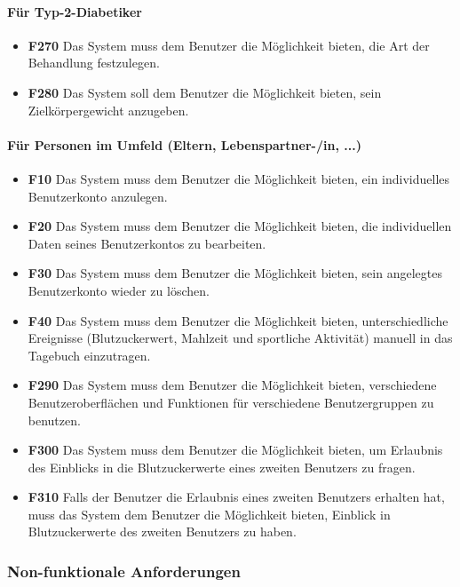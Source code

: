 	\paragraph{Für Typ-2-Diabetiker}\mbox{}
	\begin{itemize}
		\item\textbf{\lbrack F270\rbrack} Das System muss dem Benutzer die Möglichkeit bieten, die Art der Behandlung festzulegen.
		\item\textbf{\lbrack F280\rbrack} Das System soll dem Benutzer die Möglichkeit bieten, sein Zielkörpergewicht anzugeben.
	\end{itemize}
	\paragraph{Für Personen im Umfeld (Eltern, Lebenspartner-/in, ...)}\mbox{}
	\begin{itemize}
		\item\textbf{\lbrack F10\rbrack} Das System muss dem Benutzer die Möglichkeit bieten, ein individuelles Benutzerkonto anzulegen.
		\item\textbf{\lbrack F20\rbrack}  Das System muss dem Benutzer die Möglichkeit bieten, die individuellen Daten seines Benutzerkontos zu bearbeiten.
		\item\textbf{\lbrack F30\rbrack} Das System muss dem Benutzer die Möglichkeit bieten, sein angelegtes Benutzerkonto wieder zu löschen.
		\item\textbf{\lbrack F40\rbrack} Das System muss dem Benutzer die Möglichkeit bieten, unterschiedliche Ereignisse (Blutzuckerwert, Mahlzeit und sportliche Aktivität) manuell in das Tagebuch einzutragen.
		\item\textbf{\lbrack F290\rbrack} Das System muss dem Benutzer die Möglichkeit bieten, verschiedene Benutzeroberflächen und Funktionen für verschiedene Benutzergruppen zu benutzen.
		\item\textbf{\lbrack F300\rbrack} Das System muss dem Benutzer die Möglichkeit bieten, um Erlaubnis des Einblicks in die Blutzuckerwerte eines zweiten Benutzers zu fragen.
		\item\textbf{\lbrack F310\rbrack} Falls der Benutzer die Erlaubnis eines zweiten Benutzers erhalten hat, muss das System dem Benutzer die Möglichkeit bieten, Einblick in Blutzuckerwerte des zweiten Benutzers zu haben.
	\end{itemize}
\subsubsection{Non-funktionale Anforderungen}
\label{section:nfAnforderungen}
